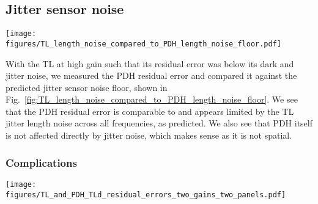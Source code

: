 \documentclass[aps,pra,superscriptaddress,reprint,nofootinbib]{revtex4-1}
\begin{document}
\subsection{Jitter sensor noise}
\label{sec:jitter_sensor_noise}

\begin{figure*}
	\texttt{[image: figures/TL\_length\_noise\_compared\_to\_PDH\_length\_noise\_floor.pdf]}
	\caption{SR785 LF measurements from January 2021 of TL and PDH dark and jitter noise projected into length noise using the error signal slopes. Comparing to projected PDH residual error noise floor at high gain, with normalised DC voltage.}
	\label{fig:TL_length_noise_compared_to_PDH_length_noise_floor}
\end{figure*}

With the TL at high gain such that its residual error was below its dark and jitter noise, we measured the PDH residual error and compared it against the predicted jitter sensor noise floor, shown in Fig.~\ref{fig:TL_length_noise_compared_to_PDH_length_noise_floor}. We see that the PDH residual error is comparable to and appears limited by the TL jitter length noise across all frequencies, as predicted. We also see that PDH itself is not affected directly by jitter noise, which makes sense as it is not spatial.

\subsubsection{Complications}

\begin{figure*}
	\texttt{[image: figures/TL\_and\_PDH\_TLd\_residual\_errors\_two\_gains\_two\_panels.pdf]}
	\caption{SR785 LF measurements from 2021-01-20 of TL (left panel) and PDH (right panel) dark and jitter noise projected into length noise. Compared against high and low gain residual errors which are corrected for their DC voltage. The TL jitter sensor noise is projected onto the PDH measurements (purple dashed trace in the right panel) to compare to the PDH high gain residual error (green solid trace in the right panel). Note that, unlike the measurements in Fig.~\ref{fig:TL_length_noise_compared_to_PDH_length_noise_floor}, all of the measurements shown here were taken on the same day.}
	\label{fig:TL_and_PDH_TLd_residual_errors_two_gains}
\end{figure*}
\end{document}

